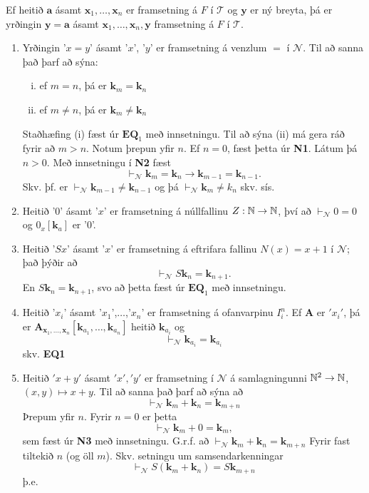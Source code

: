 \documentclass[12pt]{book}
\newcommand{\cT}{\mathcal{T}}
\newcommand{\cN}{\mathcal{N}}
\newcommand{\bA}{\mathbf{A}}
\newcommand{\ba}{\mathbf{a}}
\newcommand{\bx}{\mathbf{x}}
\newcommand{\bk}{\mathbf{k}}
\newcommand{\by}{\mathbf{y}}
\newcommand{\bxxn}{\bx_1, \dotsc, \bx_n}
\begin{document}
\begin{ath}
  Ef heitið $\ba$ ásamt $\bxxn$ er framsetning á $F$ í $\cT$ og
  $\by$ er ný breyta, þá er yrðingin $\by = \ba$ ásamt
  $\bxxn, \by$ framsetning á $F$ í $\cT$.
\end{ath}

\begin{daemi}
  \begin{enumerate}[(1)]
  \item  Yrðingin '$ x = y$' ásamt '$x$', '$y$' er framsetning á 
    venzlum $=$ í $\cN$. Til að sanna það þarf að sýna:
    \begin{enumerate}[(i)]
    \item  ef $m = n$, þá er $\bk_m = \bk_n$
    \item  ef $m \neq n$, þá er $\bk_m \neq \bk_n$
    \end{enumerate}

    Staðhæfing (i) fæst úr $\mathbf{EQ}_1$ með innsetningu.
    Til að sýna (ii) má gera ráð fyrir að $m > n$.
    Notum þrepun yfir $n$. Ef $n = 0$, fæst þetta úr \textbf{N1}.
    Látum þá $n > 0$. Með innsetningu í \textbf{N2} fæst
    \[ \vdash_{\cN} \bk_m = \bk_n \rightarrow \bk_{m-1} = \bk_{n-1}.\]
    Skv. þf. er $\vdash_{\cN} \bk_{m-1} \neq \bk_{n-1} $ og þá
    $\vdash_{\cN} \bk_m \neq k_n$ skv. sís.
  \item Heitið '$0$' ásamt '$x$' er framsetning á núllfallinu
    $Z: \mathbb{N} \to \mathbb{N}$, því að $\vdash_{\cN} 0 = 0$ og
    $0_x [\bk_a]$ er '$0$'.
  \item Heitið '$Sx$' ásamt '$x$' er framsetning á eftrifara fallinu
    $N(x) = x + 1$ í $\cN$; það þýðir að
    \[ \vdash_{\cN} S \bk_n = \bk_{n+1}.\]
    En $S\bk_n = \bk_{n+1}$, svo að þetta fæst úr
    $\mathbf{EQ}_1$ með innsetningu.
  \item Heitið '$x_i$' ásamt '$x_1$',$\dotsc$,'$x_n$' er
    framsetning á ofanvarpinu $I^n_i$. Ef
    $\bA$ er $'x_i'$, þá er $\bA_{\bxxn}[\bk_{a_1}, \dotsc, \bk_{a_n}]$
    heitið $\bk_{a_i}$ og 
    \[ \vdash_{\cN} \bk_{a_i} = \bk_{a_i} \]
    skv. \textbf{EQ1}
  \item Heitið $'x+y'$ ásamt $'x', 'y'$ er framsetning í $\cN$ á
    samlagningunni $\mathbb{N}^2 \to \mathbb{N}$,
    $(x,y) \mapsto x+y$. Til að sanna það þarf að sýna að
    \[ \vdash_{\cN} \bk_m + \bk_n = \bk_{m+n} \]
    Þrepum yfir $n$. Fyrir $ n =0$ er þetta
    \[ \vdash_{\cN} \bk_m + 0 = \bk_{m} ,\]
    sem fæst úr \textbf{N3} með innsetningu.
    G.r.f. að $\vdash_{\cN} \bk_m + \bk_n = \bk_{m+n}$
    Fyrir fast tiltekið $n$ (og öll $m$). Skv.
    setningu um samsendarkenningar
    \[ \vdash_{\cN} S(\bk_m + \bk_n) = S \bk_{m+n}\]
    þ.e.


\end{enumerate}
\end{daemi}
\end{document}
